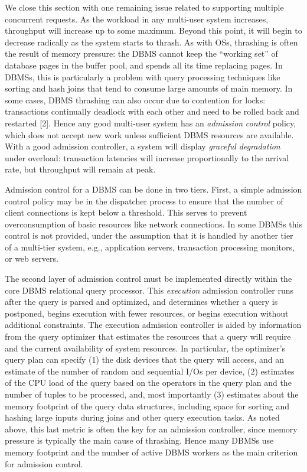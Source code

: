 \documentclass[a4paper,11pt,twoside,openright]{book}
\begin{document}
We close this section with one remaining issue related to supporting
multiple concurrent requests. As the workload in any multi-user system
increases, throughput will increase up to some maximum. Beyond this
point, it will begin to decrease radically as the system starts to
thrash. As with OSs, thrashing is often the result of memory pressure:
the DBMS cannot keep the ``working set'' of database pages in the buffer
pool, and spends all its time replacing pages. In DBMSs, this is
particularly a problem with query processing techniques like sorting and
hash joins that tend to consume large amounts of main memory. In some
cases, DBMS thrashing can also occur due to contention for locks:
transactions continually deadlock with each other and need to be rolled
back and restarted {[}2{]}. Hence any good multi-user system has an
\emph{admission} \emph{control} policy, which does not accept new work
unless sufficient DBMS resources are available. With a good admission
controller, a system will display \emph{graceful degradation} under
overload: transaction latencies will increase proportionally to the
arrival rate, but throughput will remain at peak.

Admission control for a DBMS can be done in two tiers. First, a simple
admission control policy may be in the dispatcher process to ensure that
the number of client connections is kept below a threshold. This serves
to prevent overconsumption of basic resources like network connections.
In some DBMSs this control is not provided, under the assumption that it
is handled by another tier of a multi-tier system, e.g., application
servers, transaction processing monitors, or web servers.

The second layer of admission control must be implemented directly
within the core DBMS relational query processor. This \emph{execution}
admission controller runs after the query is parsed and optimized, and
determines whether a query is postponed, begins execution with fewer
resources, or begins execution without additional constraints. The
execution admission controller is aided by information from the query
optimizer that estimates the resources that a query will require and the
current availability of system resources. In particular, the optimizer's
query plan can specify (1) the disk devices that the query will access,
and an estimate of the number of random and sequential I/Os per device,
(2) estimates of the CPU load of the query based on the operators in the
query plan and the number of tuples to be processed, and, most
importantly (3) estimates about the memory footprint of the query data
structures, including space for sorting and hashing large inputs during
joins and other query execution tasks. As noted above, this last metric
is often the key for an admission controller, since memory pressure is
typically the main cause of thrashing. Hence many DBMSs use memory
footprint and the number of active DBMS workers as the main criterion
for admission control.
\end{document}
